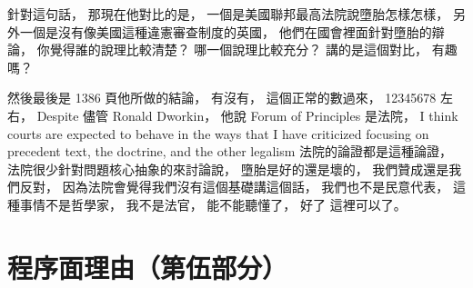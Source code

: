 \hypertarget{w06:cue:2655}{}針對這句話，
\hypertarget{w06:cue:2656}{}那現在他對比的是，
\hypertarget{w06:cue:2657}{}一個是美國聯邦最高法院說墮胎怎樣怎樣，
\hypertarget{w06:cue:2658}{}另外一個是沒有像美國這種違憲審查制度的英國，
\hypertarget{w06:cue:2659}{}他們在國會裡面針對墮胎的辯論，
\hypertarget{w06:cue:2660}{}你覺得誰的說理比較清楚？
\hypertarget{w06:cue:2661}{}哪一個說理比較充分？
\hypertarget{w06:cue:2662}{}講的是這個對比，
\hypertarget{w06:cue:2663}{}有趣嗎？

\hypertarget{w06:cue:2664}{}然後最後是 1386 頁他所做的結論，
\hypertarget{w06:cue:2665}{}有沒有，
\hypertarget{w06:cue:2666}{}這個正常的數過來，
\hypertarget{w06:cue:2667}{}12345678 左右，
\hypertarget{w06:cue:2668}{}Despite
\hypertarget{w06:cue:2669}{}儘管 Ronald Dworkin，
\hypertarget{w06:cue:2670}{}他說 Forum of Principles 是法院，
\hypertarget{w06:cue:2671}{}I think courts are expected to behave in the ways that I have criticized
\hypertarget{w06:cue:2672}{}focusing on precedent text, the doctrine, and the other legalism
\hypertarget{w06:cue:2673}{}法院的論證都是這種論證，
\hypertarget{w06:cue:2674}{}法院很少針對問題核心抽象的來討論說，
\hypertarget{w06:cue:2675}{}墮胎是好的還是壞的，
\hypertarget{w06:cue:2676}{}我們贊成還是我們反對，
\hypertarget{w06:cue:2677}{}因為法院會覺得我們沒有這個基礎講這個話，
\hypertarget{w06:cue:2678}{}我們也不是民意代表，
\hypertarget{w06:cue:2679}{}這種事情不是哲學家，
\hypertarget{w06:cue:2680}{}我不是法官，
\hypertarget{w06:cue:2681}{}能不能聽懂了，
\hypertarget{w06:cue:2682}{}好了 這裡可以了。

\section{程序面理由（第伍部分）}

